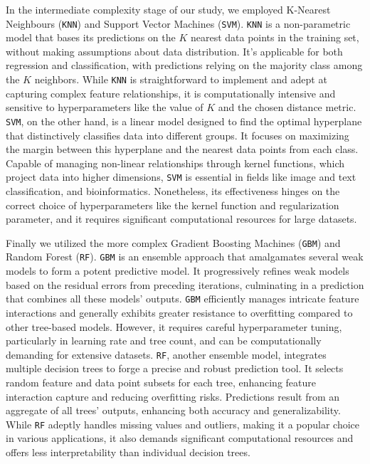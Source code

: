 \documentclass[12pt]{article}
\begin{document}
\par In the intermediate complexity stage of our study, we employed K-Nearest Neighbours (\texttt{KNN}) and Support Vector Machines (\texttt{SVM}). \texttt{KNN} is a non-parametric model that bases its predictions on the $K$ nearest data points in the training set, without making assumptions about data distribution. It's applicable for both regression and classification, with predictions relying on the majority class among the $K$ neighbors. While \texttt{KNN} is straightforward to implement and adept at capturing complex feature relationships, it is computationally intensive and sensitive to hyperparameters like the value of $K$ and the chosen distance metric. \texttt{SVM}, on the other hand, is a linear model designed to find the optimal hyperplane that distinctively classifies data into different groups. It focuses on maximizing the margin between this hyperplane and the nearest data points from each class. Capable of managing non-linear relationships through kernel functions, which project data into higher dimensions, \texttt{SVM} is essential in fields like image and text classification, and bioinformatics. Nonetheless, its effectiveness hinges on the correct choice of hyperparameters like the kernel function and regularization parameter, and it requires significant computational resources for large datasets.

\par Finally we utilized the more complex Gradient Boosting Machines (\texttt{GBM}) and Random Forest (\texttt{RF}). \texttt{GBM} is an ensemble approach that amalgamates several weak models to form a potent predictive model. It progressively refines weak models based on the residual errors from preceding iterations, culminating in a prediction that combines all these models' outputs. \texttt{GBM} efficiently manages intricate feature interactions and generally exhibits greater resistance to overfitting compared to other tree-based models. However, it requires careful hyperparameter tuning, particularly in learning rate and tree count, and can be computationally demanding for extensive datasets. \texttt{RF}, another ensemble model, integrates multiple decision trees to forge a precise and robust prediction tool. It selects random feature and data point subsets for each tree, enhancing feature interaction capture and reducing overfitting risks. Predictions result from an aggregate of all trees' outputs, enhancing both accuracy and generalizability. While \texttt{RF} adeptly handles missing values and outliers, making it a popular choice in various applications, it also demands significant computational resources and offers less interpretability than individual decision trees.
\end{document}
